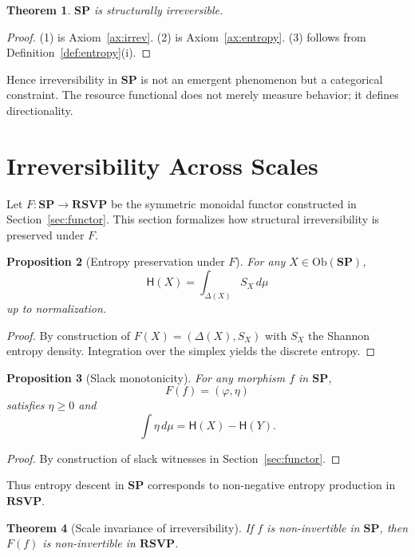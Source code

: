 \documentclass[12pt,a4paper]{article}
\newtheorem{theorem}{Theorem}[section]
\newtheorem{proposition}[theorem]{Proposition}
\theoremstyle{definition}
\theoremstyle{remark}
\newcommand{\Ent}{\ensuremath{\mathsf{H}}}
\newcommand{\SP}{\mathbf{SP}}
\newcommand{\RSVP}{\mathbf{RSVP}}
\newcommand{\Ob}{\mathrm{Ob}}
\begin{document}
\begin{theorem}
$\SP$ is structurally irreversible.
\end{theorem}

\begin{proof}
(1) is Axiom~\ref{ax:irrev}.
(2) is Axiom~\ref{ax:entropy}.
(3) follows from Definition~\ref{def:entropy}(i).
\end{proof}

Hence irreversibility in $\SP$ is not an emergent phenomenon but a
categorical constraint. The resource functional does not merely measure
behavior; it defines directionality.

\section{Irreversibility Across Scales}
\label{sec:scale}

Let $F : \SP \to \RSVP$ be the symmetric monoidal functor constructed
in Section~\ref{sec:functor}. This section formalizes how structural
irreversibility is preserved under $F$.

\begin{proposition}[Entropy preservation under $F$]
For any $X \in \Ob(\SP)$,
\[
  \Ent(X) = \int_{\Delta(X)} S_X \, d\mu
\]
up to normalization.
\end{proposition}

\begin{proof}
By construction of $F(X) = (\Delta(X),S_X)$ with $S_X$ the Shannon entropy density.
Integration over the simplex yields the discrete entropy.
\end{proof}

\begin{proposition}[Slack monotonicity]
For any morphism $f$ in $\SP$,
\[
  F(f) = (\varphi,\eta)
\]
satisfies $\eta \ge 0$ and
\[
  \int \eta \, d\mu = \Ent(X) - \Ent(Y).
\]
\end{proposition}

\begin{proof}
By construction of slack witnesses in Section~\ref{sec:functor}.
\end{proof}

Thus entropy descent in $\SP$ corresponds to non-negative entropy
production in $\RSVP$.

\begin{theorem}[Scale invariance of irreversibility]
If $f$ is non-invertible in $\SP$, then $F(f)$ is non-invertible in
$\RSVP$.
\end{theorem}
\end{document}
